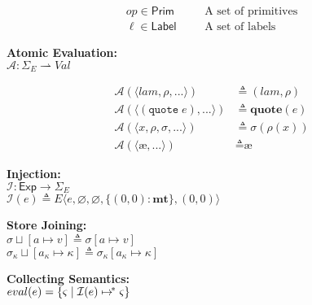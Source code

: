 \documentclass[12pt,draft]{article}
\newcommand\mae{\ensuremath{\text{\ae}}}
\newcommand{\quotesyn}[1]{(\texttt{quote}\;#1)}
\begin{document}
{\begin{multicols*}{2}
\begin{center}
\begin{align*}
  op \in \textsf{Prim} &\;\;\;\;\;\; \text{A set of primitives} \\
  \ell \in \textsf{Label} &\;\;\;\;\;\; \text{A set of labels}
\end{align*}
\end{center}
\vspace{-7mm}
\begin{center}
  \textbf{Atomic Evaluation:} \\
  $\mathcal{A} : \Sigma_E \rightharpoonup \textit{Val}$
\vspace{-7mm}
\end{center}
\begin{align*}
  \mathcal{A}(\langle lam , \rho , ... \rangle)  &\triangleq (lam , \rho) \\
  \mathcal{A}(\langle \quotesyn{e} , ... \rangle) &\triangleq \textbf{quote}(e) \\
  \mathcal{A}(\langle x, \rho , \sigma , ... \rangle) &\triangleq \sigma(\rho(x)) \\
  \mathcal{A}(\langle \mae , ... \rangle) &\triangleq \mae
\end{align*}
\vspace{-9mm}
\begin{center}
\textbf{Injection:} \\
$\mathcal{I} : \textsf{Exp} \rightarrow \Sigma_E$ \\
$\mathcal{I}(e) \triangleq E\langle e , \varnothing , \varnothing , \{(0, 0) : \textbf{mt}\} , (0, 0) \rangle$
\end{center}
\vspace{-8mm}
\begin{center}
  \textbf{Store Joining:} \\
  $\sigma \sqcup [a \mapsto v] \triangleq \sigma[a \mapsto v]$ \\
  $\sigma_\kappa \sqcup [a_\kappa \mapsto \kappa] \triangleq
  \sigma_\kappa[a_\kappa \mapsto \kappa]$
\end{center}
\begin{center}
  \textbf{Collecting Semantics:} \\
  $eval(e) = \{\varsigma \;|\; \mathcal{I}(e) \mapsto\hspace{-1.5mm}^*\; \varsigma \}$
\end{center}
\vspace{-10mm}



\end{multicols*}}
\end{document}
